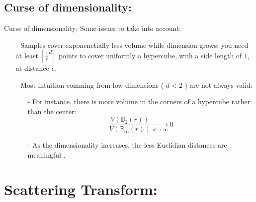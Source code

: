 \documentclass[9pt]{beamer}
\DeclarePairedDelimiter\ceil{\lceil}{\rceil}
\begin{document}
\subsection[Dimensionality]{Curse of dimensionality:}
\begin{frame}{Curse of dimensionality:}
	Some issues to take into account:
	\begin{itemize}
		\item[-] Samples cover exponenetially less volume while dimension grows: you need at least $ \ceil*{\frac{1}{\epsilon}^d}$ points to cover uniformly a hypercube, with a side length of $1$, at distance $\epsilon$.
		\item[-] Most intuition comming from low dimensions ( $ d < 2$ ) are not always valid: 
		\begin{itemize}
			\item[-] For instance, there is more volume in the corners of a hypercube rather than the center:
			$$\frac{V(\mathbb{B}_{2}(r))}{V(\mathbb{B}_{\infty}(r))}\xrightarrow[d \to \infty]{} 0$$
			\item[-] As the dimensionality increases, the less Euclidian distances are meaningful \cite{Domingos:2012:FUT:2347736.2347755}.
		\end{itemize}
	\end{itemize}
\end{frame}



\section[Scattering]{Scattering Transform:}


\end{document}
